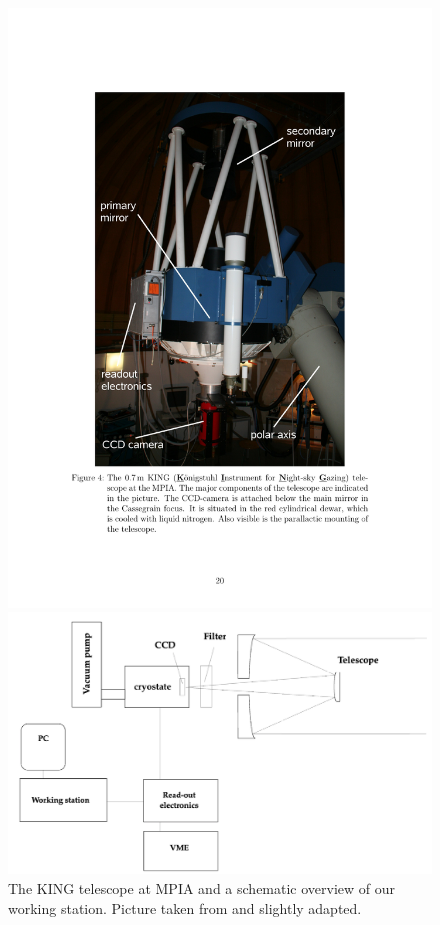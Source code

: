 \begin{figure}[H]
	\begin{minipage}{0.4\textwidth}
	\hspace{0.8cm}
		\includegraphics[scale = 0.38]{figures/Experimental Setup/image_layout}
	\end{minipage}
	\begin{minipage}{0.4\textwidth}
		\hspace{0.8cm}
		\includegraphics[scale=0.17]{figures/Experimental Setup/layout_eng}
	\end{minipage}

	\caption[The KING telescope at MPIA]{The KING telescope at MPIA and a schematic overview of our working station. Picture taken from \cite{Pott2017} and slightly adapted.}
	\label{fig: working station}
\end{figure}  

